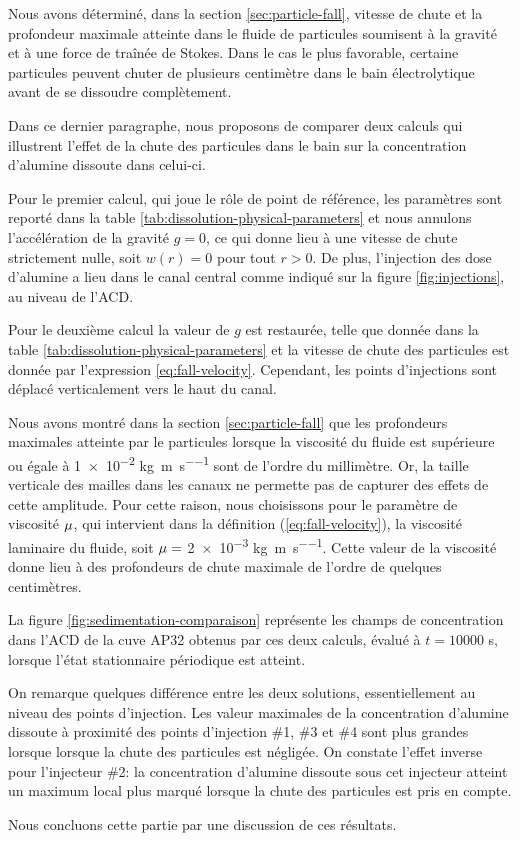 Nous avons déterminé, dans la section \ref{sec:particle-fall}, vitesse
de chute et la profondeur maximale atteinte dans le fluide de
particules soumisent à la gravité et à une force de traînée
de Stokes. Dans le cas le plus favorable, certaine particules peuvent
chuter de plusieurs centimètre dans le bain électrolytique avant de se
dissoudre complètement.

Dans ce dernier paragraphe, nous proposons de comparer deux calculs
qui illustrent l'effet de la chute des particules dans le bain sur la
concentration d'alumine dissoute dans celui-ci.

Pour le premier calcul, qui joue le rôle de point de référence, les
paramètres sont reporté dans la table
\ref{tab:dissolution-physical-parameters} et nous annulons
l'accélération de la gravité $g = 0$, ce qui donne lieu à une vitesse
de chute strictement nulle, soit $w(r) = 0$ pour tout $r>0$. De plus,
l'injection des dose d'alumine a lieu dans le canal central comme
indiqué sur la figure \ref{fig:injections}, au niveau de l'ACD.

Pour le deuxième calcul la valeur de $g$ est restaurée, telle que
donnée dans la table \ref{tab:dissolution-physical-parameters} et la
vitesse de chute des particules est donnée par l'expression
\ref{eq:fall-velocity}. Cependant, les points d'injections sont
déplacé verticalement vers le haut du canal.

Nous avons montré dans la section \ref{sec:particle-fall} que les
profondeurs maximales atteinte par le particules lorsque la viscosité
du fluide est supérieure ou égale à \num{1e-2}
\si{\kilo\gram\per\meter\per\second} sont de l'ordre du
millimètre. Or, la taille verticale des mailles dans les canaux ne
permette pas de capturer des effets de cette amplitude. Pour cette raison,
nous choisissons pour le paramètre de viscosité $\mu$, qui
intervient dans la définition (\ref{eq:fall-velocity}), la viscosité
laminaire du fluide, soit $\mu = $ \num{2e-3}
\si{\kilo\gram\per\meter\per\second}. Cette valeur de la viscosité
donne lieu à des profondeurs de chute maximale de l'ordre de
quelques centimètres.


La figure \ref{fig:sedimentation-comparaison} représente les champs de
concentration dans l'ACD de la cuve AP32 obtenus par ces deux calculs,
évalué à $t = \num{10000}$ \si{\second}, lorsque l'état stationnaire
périodique est atteint.

On remarque quelques différence entre les deux solutions,
essentiellement au niveau des points d'injection. Les valeur maximales
de la concentration d'alumine dissoute à proximité des points
d'injection \#1, \#3 et \#4 sont plus grandes lorsque lorsque la chute
des particules est négligée. On constate l'effet inverse pour
l'injecteur \#2: la concentration d'alumine dissoute sous cet
injecteur atteint un maximum local plus marqué lorsque la chute des
particules est pris en compte.

Nous concluons cette partie par une discussion de ces résultats.
